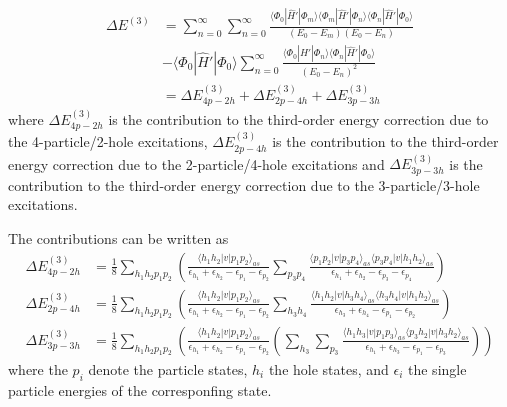 \begin{align}
\nonumber
\Delta E^{(3)} &= \sum_{n=0}^{\infty} \sum_{n=0}^{\infty}  \frac{  \langle \Phi_0 |\hat{H}'| \Phi_m  \rangle  \langle \Phi_m |\hat{H}'| \Phi_n  \rangle \langle \Phi_n |\hat{H}'| \Phi_0  \rangle }{(E_0 - E_m)(E_0 - E_n)} \\ \nonumber
&  - \langle \Phi_0 |\hat{H}'| \Phi_0  \rangle \sum_{n=0}^{\infty} \frac{ \langle \Phi_0 |\hat{H}'| \Phi_n  \rangle \langle \Phi_n |\hat{H}'| \Phi_0  \rangle }{(E_0 - E_n)^2}\\
&= \Delta E^{(3)}_{4p-2h} + \Delta E^{(3)}_{2p-4h} + \Delta E^{(3)}_{3p-3h}
\end{align}
where $\Delta E^{(3)}_{4p-2h}$ is the contribution to the third-order energy correction due to the 4-particle/2-hole excitations, $\Delta E^{(3)}_{2p-4h}$ is the contribution to the third-order energy correction due to the 2-particle/4-hole excitations  and  $\Delta E^{(3)}_{3p-3h}$ is the contribution to the third-order energy correction due to the 3-particle/3-hole excitations.

The contributions can be written as
\begin{align}
\label{MBPTcorrections3}
\Delta E^{(3)}_{4p-2h} &= \frac{1}{8} \sum_{h_1 h_2 p_1 p_2}  \left(  \frac{\langle h_1 h_2 |v|p_1 p_2 \rangle_{as}}{\epsilon_{h_1}+\epsilon_{h_2}-\epsilon_{p_1}-\epsilon_{p_2}}  \sum_{p_3 p_4} \frac{\langle p_1 p_2 |v|p_3 p_4 \rangle_{as} \langle p_3 p_4 |v|h_1 h_2 \rangle_{as}}{\epsilon_{h_1}+\epsilon_{h_2}-\epsilon_{p_3}-\epsilon_{p_4}}    \right) \\
\Delta E^{(3)}_{2p-4h} &= \frac{1}{8} \sum_{h_1 h_2 p_1 p_2}  \left(  \frac{\langle h_1 h_2 |v|p_1 p_2 \rangle_{as}}{\epsilon_{h_1}+\epsilon_{h_2}-\epsilon_{p_1}-\epsilon_{p_2}}  \sum_{h_3 h_4} \frac{\langle h_1 h_2 |v|h_3 h_4 \rangle_{as} \langle h_3 h_4 |v|h_1 h_2 \rangle_{as}}{\epsilon_{h_3}+\epsilon_{h_4}-\epsilon_{p_1}-\epsilon_{p_2}}    \right) \\ 
\Delta E^{(3)}_{3p-3h} &= \frac{1}{8} \sum_{h_1 h_2 p_1 p_2}  \left(  \frac{\langle h_1 h_2 |v|p_1 p_2 \rangle_{as}}{\epsilon_{h_1}+\epsilon_{h_2}-\epsilon_{p_1}-\epsilon_{p_2}} \left( \sum_{h_3}\sum_{p_3} \frac{\langle h_1 h_3 |v|p_1 p_3 \rangle_{as} \langle p_3 h_2 |v|h_3 h_2 \rangle_{as}}{\epsilon_{h_1}+\epsilon_{h_3}-\epsilon_{p_1}-\epsilon_{p_3}}  \right)  \right)
\end{align}
where the $p_i$ denote the  particle states, $h_i$ the hole states, and $\epsilon_{i}$ the single particle energies of the corresponfing state.


